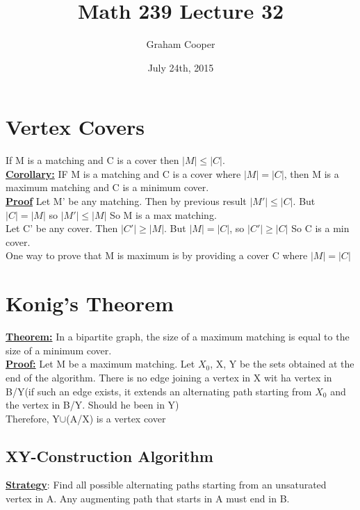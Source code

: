\documentclass[12pt]{article}
\title{\vspace{-15ex}Math 239 Lecture 32\vspace{-1ex}}
\date{July 24th, 2015}
\author{Graham Cooper}
\newcommand{\myt}[1]{\textbf{\underline{#1}}}
\begin{document}
	\maketitle
	
	\section*{Vertex Covers}
	If M is a matching and C is a cover then $|M| \leq |C|$.\\
	
	\myt{Corollary:} IF M is a matching and C is a cover where $|M| = |C|$, then M is a maximum matching and C is a minimum cover.\\
	
	\myt{Proof} Let M' be any matching. Then by previous result $|M'| \leq |C|$. But $|C| = |M|$ so $|M'| \leq |M|$ So M is a max matching.\\
	
	Let C' be any cover. Then $|C'| \geq |M|$. But $|M| = |C|$, so $|C'| \geq |C|$ So C is a min cover.\\
	One way to prove that M is maximum is by providing a cover C where $|M| = |C|$\\
	
	\section*{Konig's Theorem}
	\myt{Theorem:} In a bipartite graph, the size of a maximum matching is equal to the size of a minimum cover.\\
	
	\myt{Proof:} Let M be a maximum matching. Let $X_0$, X, Y be the sets obtained at the end of the algorithm. There is no edge joining a vertex in X wit ha vertex in B/Y(if such an edge exists, it extends an alternating path starting from $X_0$ and the vertex in B/Y. Should he been in Y) \\
	Therefore, Y$\cup$(A/X) is a vertex cover\\
	
	\subsection*{XY-Construction Algorithm}
	
	\myt{Strategy}: Find all possible alternating paths starting from an unsaturated vertex in A. Any augmenting path that starts in A must end in B.\\
	

	
\end{document}
